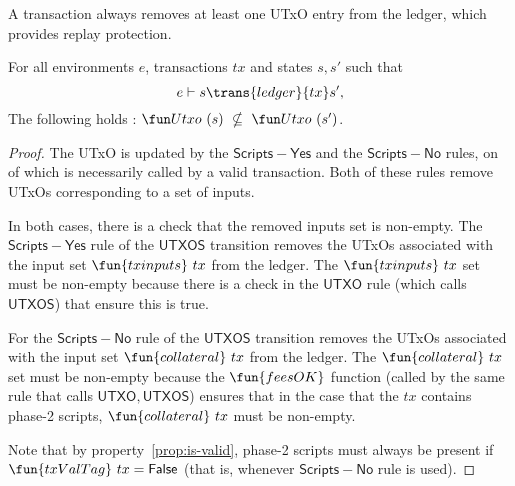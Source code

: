 \begin{property}
  \label{prop:replay}

A transaction always removes at least one UTxO entry from the ledger, which provides
replay protection.

\begin{lemma}
  For all environments $e$, transactions $tx$ and states $s, s'$ such that
  \begin{equation*}
    e\vdash s\trans{ledger}{tx}s',
  \end{equation*}
  The following holds : $\Utxo~(s)~\nsubseteq~\Utxo~(s')$.
\end{lemma}
\begin{proof}
  The UTxO is updated by the $\mathsf{Scripts{-}Yes}$ and the $\mathsf{Scripts{-}No}$
  rules, on of which is necessarily called by a valid transaction. Both of these
  rules remove UTxOs corresponding to a set of inputs.

  In both cases, there is a check that the removed inputs set is non-empty.
  The $\mathsf{Scripts{-}Yes}$ rule of the $\mathsf{UTXOS}$ transition
  removes the UTxOs associated with the input set $\fun{txinputs}~{tx}$ from the ledger.
  The $\fun{txinputs}~{tx}$ set must be non-empty because there is a check in the
  $\mathsf{UTXO}$ rule (which calls $\mathsf{UTXOS}$) that ensure this is true.

  For the $\mathsf{Scripts{-}No}$ rule of the $\mathsf{UTXOS}$ transition
  removes the UTxOs associated with the input set $\fun{collateral}~{tx}$ from the ledger.
  The $\fun{collateral}~{tx}$ set must be non-empty because
  the $\fun{feesOK}$ function (called by the same rule that calls $\mathsf{UTXO},
  \mathsf{UTXOS}$) ensures that in the case that the $tx$ contains phase-2 scripts,
  $\fun{collateral}~{tx}$ must be non-empty.

  Note that by property~\ref{prop:is-valid}, phase-2 scripts must always be present
  if $\fun{txValTag}~tx = \False$ (that is, whenever $\mathsf{Scripts{-}No}$ rule is used).
\end{proof}
\end{property}

